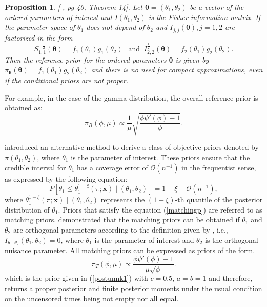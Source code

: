 \documentclass[12pt]{article} %
\theoremstyle{plain}%
\newtheorem{proposition}[theorem]{Proposition}
\theoremstyle{definition}
\theoremstyle{remark}
\begin{document}
\begin{proposition}\label{propositionop} [ \cite{bernardo2005}, pg 40, Theorem 14]. Let $\boldsymbol\theta=(\theta_1,\theta_2)$ be a vector of the ordered parameters of interest and $I(\theta_1,\theta_2)$ is the Fisher information matrix. If the parameter space  of $\theta_1$ does not depend of $\theta_2$ and $I_{j,j}(\boldsymbol\theta), j=1,2$ are factorized in the form 
\begin{equation*}
S_{1,1}^{-\frac{1}{2}}(\boldsymbol\theta)=f_1(\theta_1)g_1(\theta_2) \ \ \mbox{ and } \ I_{2,2}^{\frac{1}{2}}(\boldsymbol\theta)=f_2(\theta_1)g_2(\theta_2) . 
\end{equation*}
Then the reference prior for the ordered parameters $\boldsymbol\theta$ is given by $\pi_{\boldsymbol\theta}(\boldsymbol\theta)=f_1(\theta_1)g_2(\theta_2)$ and there is no need for compact approximations, even if the conditional priors are not proper.
\end{proposition} 

For example, in the case of the gamma distribution, the overall reference prior is obtained as:
\begin{equation*}%
\pi_R\left(\phi,\mu\right)\propto \frac{1}{\mu}\sqrt{\frac{\phi\psi'(\phi)-1}{\phi}}.
\end{equation*}

\cite{tibshirani1989noninformative} introduced an alternative method to derive a class of objective priors denoted by $\pi\left(\theta_1, \theta_2\right)$, where $\theta_1$ is the parameter of interest. These priors ensure that the credible interval for $\theta_1$ has a coverage error of $\mathcal{O}\left(n^{-1}\right)$ in the frequentist sense, as expressed by the following equation:
\begin{equation}\label{matchingp}
P\left[\theta_1\leq\theta_1^{1-\xi}\left(\pi;\boldsymbol{x}\right) \mid \left(\theta_1,\theta_2\right)\right] =
1-\xi-\mathcal{O}\left(n^{-1}\right),
\end{equation}
where $\theta_1^{1-\xi}\left(\pi;\boldsymbol{x}\right) \mid \left(\theta_1,\theta_2\right)$ represents the $(1-\xi)$-th quantile of the posterior distribution of $\theta_1$. Priors that satisfy the equation (\ref{matchingp}) are referred to as matching priors. \cite{tibshirani1989noninformative} demonstrated that the matching priors can be obtained if $\theta_1$ and $\theta_2$ are orthogonal parameters according to the definition given by  \cite{cox1987parameter}, i.e., $I_{\theta_1, \theta_2}\left(\theta_1, \theta_2\right)=0$, where $\theta_1$ is the parameter of interest and $\theta_2$ is the orthogonal nuisance parameter. All matching priors can be expressed as priors of the form.
\begin{equation*}%
\pi_{T}\left(\phi,\mu\right)\propto \frac{\phi\psi'(\phi)-1}{\mu\sqrt{\phi}}.
\end{equation*}
which is the prior given in (\ref{postunnk1}) with $c=0.5$, $a=b=1$ and therefore, returns a proper posterior and finite posterior moments under the usual condition on the uncensored times being not empty nor all equal.
\end{document}
